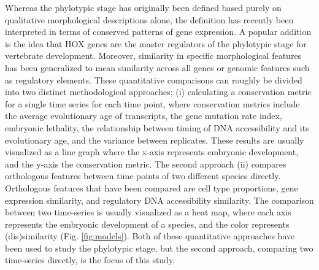 Whereas the phylotypic stage has originally been defined based purely on qualitative morphological descriptions alone, the definition has recently been interpreted in terms of conserved patterns of gene expression. A popular addition is the idea that HOX genes are the master regulators of the phylotypic stage for vertebrate development\cite{Duboule1994}. Moreover, similarity in specific morphological features has been generalized to mean similarity across all genes or genomic features such as regulatory elements. These quantitative comparisons can roughly be divided into two distinct methodological approaches; (i) calculating a conservation metric for a single time series for each time point, where conservation metrics include the average evolutionary age of transcripts\cite{DomazetLoso2010}, the gene mutation rate index\cite{Quint2012, Piasecka2013}, embryonic lethality\cite{Uchida2018}, the relationship between timing of DNA accessibility and its evolutionary age\cite{Uesaka2019}, and the variance between replicates\cite{Liu2020, Uchida2022}. These results are usually visualized as a line graph where the x-axis represents embryonic development, and the y-axis the conservation metric. The second approach (ii) compares orthologous features between time points of two different species directly. Orthologous features that have been compared are cell type proportions\cite{Mayshar2023}, gene expression similarity\cite{Irie2011, Kalinka2010, Levin2016, marletaz2018, PerezPosada2022, Leong2021}, and regulatory DNA accessibility similarity\cite{Hu2017, Liu2021}. The comparison between two time-series is usually visualized as a heat map, where each axis represents the embryonic development of a species, and the color represents (dis)similarity (Fig. \ref{fig:models}). Both of these quantitative approaches have been used to study the phylotypic stage, but the second approach, comparing two time-series directly, is the focus of this study. 

